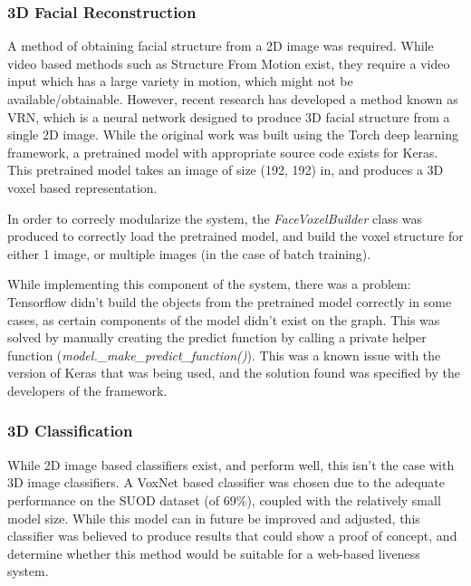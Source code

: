 \documentclass[10pt,a4paper]{article}
\begin{document}
        \subsubsection{3D Facial Reconstruction}
            A method of obtaining facial structure from a 2D image was required. While video based methods such as Structure From Motion exist, they require a video input which has a large variety in motion, which might not be available/obtainable.
            However, recent research has developed a method known as VRN, which is a neural network designed to produce 3D facial structure from a single 2D image. \cite{3DReconstructionMethod}
            While the original work was built using the Torch deep learning framework, a pretrained model with appropriate source code exists for Keras. \cite{VRNTorchToKeras} This pretrained model
            takes an image of size (192, 192) in, and produces a 3D voxel based representation. 


            In order to correcly modularize the system, the \emph{FaceVoxelBuilder} class was produced to correctly load the pretrained model, and build the voxel structure for either 1 image, or multiple images (in the case of batch training).

            While implementing this component of the system, there was a problem: Tensorflow didn't build the objects from the pretrained model correctly in some cases, as certain components of the model didn't exist on the graph. This was solved by manually creating the predict function by calling a private helper function (\emph{model.\_make\_predict\_function()}).
            This was a known issue with the version of Keras that was being used, and the solution found was specified by the developers of the framework. \cite{KerasVoxNetBug}

        \subsubsection{3D Classification}
            While 2D image based classifiers exist, and perform well, this isn't the case with 3D image classifiers. A VoxNet based classifier was chosen due to the adequate performance on the SUOD dataset (of 69\%),
            coupled with the relatively small model size. \cite{VoxNetModel} While this model can in future be improved and adjusted, this classifier was believed to produce results that could show a proof of concept,
            and determine whether this method would be suitable for a web-based liveness system. 
\end{document}
